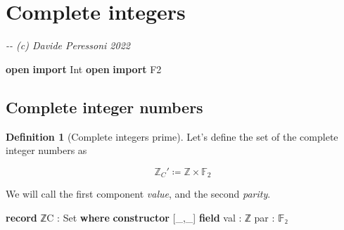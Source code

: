 \documentclass[
]{article}
\author{}
\date{\vspace{-2.5em}}
\newenvironment{Shaded}{\begin{snugshade}}{\end{snugshade}}
\newcommand{\CommentTok}[1]{\textcolor[rgb]{0.56,0.35,0.01}{\textit{#1}}}
\newcommand{\DataTypeTok}[1]{\textcolor[rgb]{0.13,0.29,0.53}{#1}}
\newcommand{\KeywordTok}[1]{\textcolor[rgb]{0.13,0.29,0.53}{\textbf{#1}}}
\newcommand{\NormalTok}[1]{#1}
\newcommand{\OtherTok}[1]{\textcolor[rgb]{0.56,0.35,0.01}{#1}}
\theoremstyle{definition}
\newtheorem{definition}{Definition}[section]
\theoremstyle{definition}
\theoremstyle{definition}
\theoremstyle{definition}
\theoremstyle{remark}
\begin{document}
{
\setcounter{tocdepth}{2}
\tableofcontents
}
\hypertarget{complete-integers}{%
\section{Complete integers}\label{complete-integers}}

\begin{Shaded}
\begin{Highlighting}[]
\CommentTok{{-}{-} (c) Davide Peressoni 2022}

\KeywordTok{open} \KeywordTok{import}\NormalTok{ Int}
\KeywordTok{open} \KeywordTok{import}\NormalTok{ F2}
\end{Highlighting}
\end{Shaded}

\hypertarget{complete-integer-numbers}{%
\subsection{Complete integer numbers}\label{complete-integer-numbers}}

\begin{definition}[Complete integers prime]

Let's define the set of the complete integer numbers as

\[\mathbb{Z}_C' \coloneqq \mathbb{Z}\times\mathbb{F}_2\]

We will call the first component \emph{value}, and the second \emph{parity}.

\begin{Shaded}
\begin{Highlighting}[]
\KeywordTok{record}\NormalTok{ ℤC\textquotesingle{} }\OtherTok{:} \DataTypeTok{Set} \KeywordTok{where}
  \KeywordTok{constructor}\NormalTok{ [}\OtherTok{\_}\NormalTok{,}\OtherTok{\_}\NormalTok{]}
  \KeywordTok{field}
\NormalTok{    val }\OtherTok{:}\NormalTok{ ℤ}
\NormalTok{    par }\OtherTok{:}\NormalTok{ 𝔽₂}
\end{Highlighting}
\end{Shaded}

\end{definition}
\end{document}

